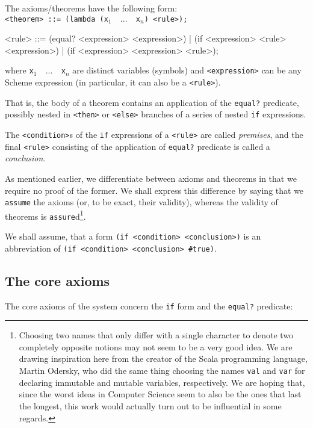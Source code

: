 The axioms/theorems have the following form: \\

\texttt{<theorem> ::= (lambda (x$_1$\,\,$...$\,\,x$_n$) <rule>);}

\begin{Snippet}
   <rule> ::= (equal? <expression> <expression>)
            | (if <expression> <rule> <expression>)
            | (if <expression> <expression> <rule>);
\end{Snippet}

where \texttt{x$_1$\,\,$...$\,\,x$_n$} are distinct variables (symbols) and
\texttt{<expression>} can be any Scheme expression (in particular,
it can also be a \texttt{<rule>}).

That is, the body of a theorem contains an application
of the \texttt{equal?} predicate, possibly nested in
\texttt{<then>} or \texttt{<else>} branches of a series
of nested \texttt{if} expressions.

The \texttt{<condition>}s of the \texttt{if} expressions
of a \texttt{<rule>} are called \textit{premises}, and the
final \texttt{<rule>} consisting of the application of
\texttt{equal?} predicate is called a \textit{conclusion}.

As mentioned earlier, we differentiate between axioms and
theorems in that we require no proof of the former. We shall
express this difference by saying that we \texttt{assume}
the axioms (or, to be exact, their validity), whereas the
validity of theorems is \texttt{assure}d\footnote{
  Choosing two names that only differ with a single
  character to denote two completely opposite notions may
  not seem to be a very good idea. We are drawing inspiration
  here from the creator of the Scala programming language,
  Martin Odersky, who did the same thing choosing the names
  \texttt{val} and \texttt{var} for declaring immutable
  and mutable variables, respectively.
  We are hoping that, since the worst ideas in Computer
  Science seem to also be the ones that last the longest,
  this work would actually turn out to be influential in
  some regards.
}.

We shall assume, that a form \texttt{(if <condition> <conclusion>)}
is an abbreviation of \texttt{(if <condition> <conclusion> \#true)}.

\subsection{The core axioms}

The core axioms of the system concern the \texttt{if} form
and the \texttt{equal?} predicate:

